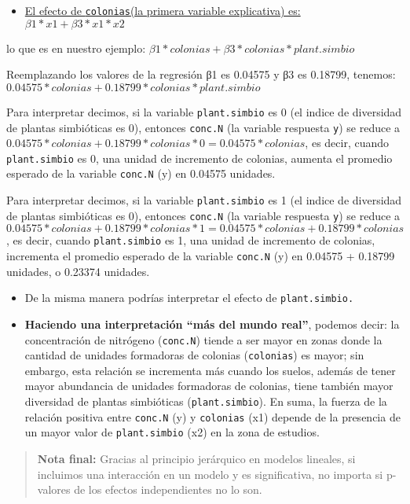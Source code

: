 \documentclass[
]{article}
\providecommand{\tightlist}{%
  \setlength{\itemsep}{0pt}\setlength{\parskip}{0pt}}
\begin{document}
\begin{itemize}
\tightlist
\item
  \underline{El efecto de \texttt{colonias}(la primera variable
  explicativa) es:} \(β1*x1+ β3*x1*x2\)
\end{itemize}

lo que es en nuestro ejemplo: \(β1*colonias + β3*colonias*plant.simbio\)

Reemplazando los valores de la regresión β1 es 0.04575 y β3 es 0.18799,
tenemos: \(0.04575*colonias + 0.18799*colonias*plant.simbio\)

Para interpretar decimos, si la variable \texttt{plant.simbio} es 0 (el
indice de diversidad de plantas simbióticas es 0), entonces
\texttt{conc.N} (la variable respuesta \texttt{y}) se reduce a
\(0.04575*colonias + 0.18799*colonias*0 = 0.04575*colonias\), es decir,
cuando \texttt{plant.simbio} es 0, una unidad de incremento de colonias,
aumenta el promedio esperado de la variable \texttt{conc.N} (y) en
0.04575 unidades.

Para interpretar decimos, si la variable \texttt{plant.simbio} es 1 (el
indice de diversidad de plantas simbióticas es 0), entonces
\texttt{conc.N} (la variable respuesta \texttt{y}) se reduce a
\(0.04575*colonias + 0.18799*colonias*1 = 0.04575*colonias + 0.18799*colonias\),
es decir, cuando \texttt{plant.simbio} es 1, una unidad de incremento de
colonias, incrementa el promedio esperado de la variable \texttt{conc.N}
(y) en 0.04575 + 0.18799 unidades, o 0.23374 unidades.

\begin{itemize}
\item
  De la misma manera podrías interpretar el efecto de
  \texttt{plant.simbio.}
\item
  \textbf{Haciendo una interpretación ``más del mundo real''}, podemos
  decir: la concentración de nitrógeno (\texttt{conc.N}) tiende a ser
  mayor en zonas donde la cantidad de unidades formadoras de colonias
  (\texttt{colonias}) es mayor; sin embargo, esta relación se incrementa
  más cuando los suelos, además de tener mayor abundancia de unidades
  formadoras de colonias, tiene también mayor diversidad de plantas
  simbióticas (\texttt{plant.simbio}). En suma, la fuerza de la relación
  positiva entre \texttt{conc.N} (y) y \texttt{colonias} (x1) depende de
  la presencia de un mayor valor de \texttt{plant.simbio} (x2) en la
  zona de estudios.
\end{itemize}

\begin{quote}
\textbf{Nota final:} Gracias al principio jerárquico en modelos
lineales, si incluimos una interacción en un modelo y es significativa,
no importa si p-valores de los efectos independientes no lo son.
\end{quote}
\end{document}
